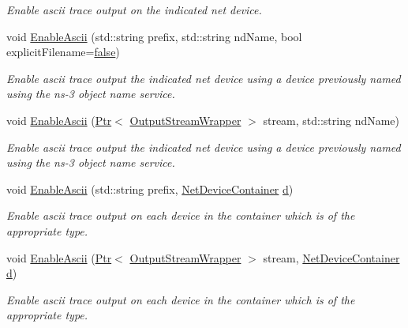 \begin{DoxyCompactItemize}
\begin{DoxyCompactList}\small\item\em Enable ascii trace output on the indicated net device. \end{DoxyCompactList}\item 
void \hyperlink{classns3_1_1AsciiTraceHelperForDevice_a0e78e422f8ffad5b376d003e4fa8b5ad}{Enable\+Ascii} (std\+::string prefix, std\+::string nd\+Name, bool explicit\+Filename=\hyperlink{lte__cqi__generation_8m_ab1bef239d413c4da139c4bac92cd657a}{false})
\begin{DoxyCompactList}\small\item\em Enable ascii trace output the indicated net device using a device previously named using the ns-\/3 object name service. \end{DoxyCompactList}\item 
void \hyperlink{classns3_1_1AsciiTraceHelperForDevice_ae291d78ad1916f34f039696750e39587}{Enable\+Ascii} (\hyperlink{classns3_1_1Ptr}{Ptr}$<$ \hyperlink{classns3_1_1OutputStreamWrapper}{Output\+Stream\+Wrapper} $>$ stream, std\+::string nd\+Name)
\begin{DoxyCompactList}\small\item\em Enable ascii trace output the indicated net device using a device previously named using the ns-\/3 object name service. \end{DoxyCompactList}\item 
void \hyperlink{classns3_1_1AsciiTraceHelperForDevice_a6aed65cb349d74b6a77bacf924f7cbcd}{Enable\+Ascii} (std\+::string prefix, \hyperlink{classns3_1_1NetDeviceContainer}{Net\+Device\+Container} \hyperlink{lte__pathloss_8m_a1aabac6d068eef6a7bad3fdf50a05cc8}{d})
\begin{DoxyCompactList}\small\item\em Enable ascii trace output on each device in the container which is of the appropriate type. \end{DoxyCompactList}\item 
void \hyperlink{classns3_1_1AsciiTraceHelperForDevice_aa21d4ed817f7fb75db5cab15e2cfecd9}{Enable\+Ascii} (\hyperlink{classns3_1_1Ptr}{Ptr}$<$ \hyperlink{classns3_1_1OutputStreamWrapper}{Output\+Stream\+Wrapper} $>$ stream, \hyperlink{classns3_1_1NetDeviceContainer}{Net\+Device\+Container} \hyperlink{lte__pathloss_8m_a1aabac6d068eef6a7bad3fdf50a05cc8}{d})
\begin{DoxyCompactList}\small\item\em Enable ascii trace output on each device in the container which is of the appropriate type. \end{DoxyCompactList}\item 

\end{DoxyCompactItemize}
